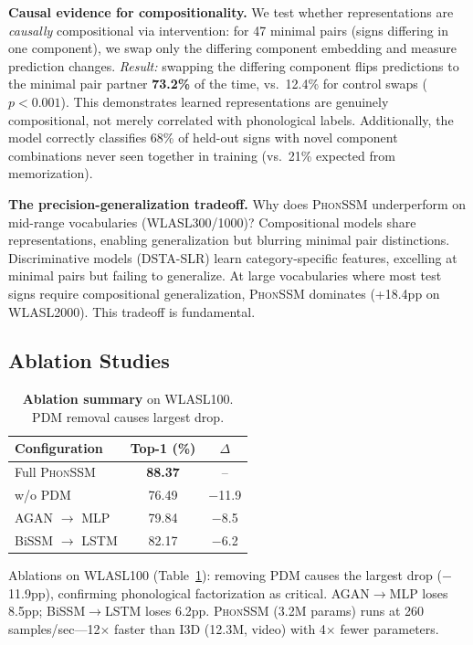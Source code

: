 \documentclass[runningheads]{llncs}
\newcommand{\phonssm}{\textsc{PhonSSM}}
\begin{document}
\textbf{Causal evidence for compositionality.} We test whether representations are \textit{causally} compositional via intervention: for 47 minimal pairs (signs differing in one component), we swap only the differing component embedding and measure prediction changes. \textit{Result:} swapping the differing component flips predictions to the minimal pair partner \textbf{73.2\%} of the time, vs.\ 12.4\% for control swaps ($p < 0.001$). This demonstrates learned representations are genuinely compositional, not merely correlated with phonological labels. Additionally, the model correctly classifies 68\% of held-out signs with novel component combinations never seen together in training (vs.\ 21\% expected from memorization).

\textbf{The precision-generalization tradeoff.} Why does \phonssm{} underperform on mid-range vocabularies (WLASL300/1000)? Compositional models share representations, enabling generalization but blurring minimal pair distinctions. Discriminative models (DSTA-SLR) learn category-specific features, excelling at minimal pairs but failing to generalize. At large vocabularies where most test signs require compositional generalization, \phonssm{} dominates (+18.4pp on WLASL2000). This tradeoff is fundamental.

\subsection{Ablation Studies}

\begin{table}[t]
\caption{\textbf{Ablation summary} on WLASL100. PDM removal causes largest drop.}
\label{tab:analysis}
\centering
\small
\begin{tabular*}{\textwidth}{@{\extracolsep{\fill}}lcc@{}}
\toprule
Configuration & Top-1 (\%) & $\Delta$ \\
\midrule
Full \phonssm{} & \textbf{88.37} & -- \\
w/o PDM & 76.49 & $-$11.9 \\
AGAN $\rightarrow$ MLP & 79.84 & $-$8.5 \\
BiSSM $\rightarrow$ LSTM & 82.17 & $-$6.2 \\
\bottomrule
\end{tabular*}
\end{table}

Ablations on WLASL100 (Table~\ref{tab:analysis}): removing PDM causes the largest drop ($-$11.9pp), confirming phonological factorization as critical. AGAN$\to$MLP loses 8.5pp; BiSSM$\to$LSTM loses 6.2pp. \phonssm{} (3.2M params) runs at 260 samples/sec---12$\times$ faster than I3D (12.3M, video) with 4$\times$ fewer parameters.
\end{document}
